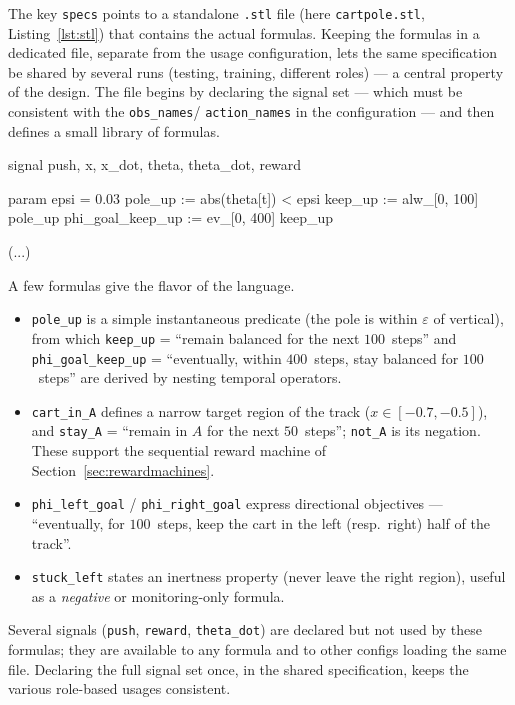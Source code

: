 \noindent
The key \texttt{specs} points to a standalone \texttt{.stl} file (here
\texttt{cartpole.stl}, Listing~\ref{lst:stl}) that contains the actual formulas.
Keeping the formulas in a dedicated file, separate from the usage configuration,
lets the same specification be shared by several runs (testing, training, different
roles) --- a central property of the design. The file begins by declaring the
signal set --- which must be consistent with the \texttt{obs\_names}/
\texttt{action\_names} in the configuration --- and then defines a small library of
formulas.

\begin{stllisting}[caption={STL specification for CartPole
(\texttt{examples/cartpole/cartpole.stl}).},label={lst:stl}]
signal push, x, x_dot, theta, theta_dot, reward

param epsi = 0.03
pole_up          := abs(theta[t]) < epsi
keep_up          := alw_[0, 100] pole_up
phi_goal_keep_up := ev_[0, 400] keep_up

(...)

\end{stllisting}

\noindent
A few formulas give the flavor of the language.
\begin{itemize}
  \item \texttt{pole\_up} is a simple instantaneous predicate (the pole is within
  $\varepsilon$ of vertical), from which \texttt{keep\_up} = ``remain balanced for
  the next $100$~steps'' and \texttt{phi\_goal\_keep\_up} = ``eventually, within
  $400$~steps, stay balanced for $100$~steps'' are derived by nesting temporal
  operators.
  \item \texttt{cart\_in\_A} defines a narrow target region of the track
  ($x\in[-0.7,-0.5]$), and \texttt{stay\_A} = ``remain in $A$ for the next
  $50$~steps''; \texttt{not\_A} is its negation. These support the sequential
  reward machine of Section~\ref{sec:rewardmachines}.
  \item \texttt{phi\_left\_goal} / \texttt{phi\_right\_goal} express directional
  objectives --- ``eventually, for $100$~steps, keep the cart in the left (resp.\
  right) half of the track''.
  \item \texttt{stuck\_left} states an inertness property (never leave the right
  region), useful as a \emph{negative} or monitoring-only formula.
\end{itemize}

Several signals (\texttt{push}, \texttt{reward}, \texttt{theta\_dot}) are declared
but not used by these formulas; they are available to any formula and to other
configs loading the same file. Declaring the full signal set once, in the shared
specification, keeps the various role-based usages consistent.

